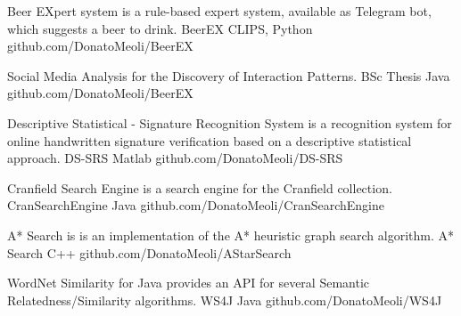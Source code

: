 

\begin{cventries}

  \cventry
    {Beer EXpert system is a rule-based expert system, available as Telegram bot, which suggests a beer to drink.} %
    {BeerEX} %
    {CLIPS, Python} %
    {github.com/DonatoMeoli/BeerEX} %
    {}

  \cventry
    {Social Media Analysis for the Discovery of Interaction Patterns.} %
    {BSc Thesis} %
    {Java} %
    {github.com/DonatoMeoli/BeerEX} %
    {}

  \cventry
    {Descriptive Statistical - Signature Recognition System is a recognition system for online handwritten signature verification based on a descriptive statistical approach.} %
    {DS-SRS} %
    {Matlab} %
    {github.com/DonatoMeoli/DS-SRS} %
    {}

  \cventry
    {Cranfield Search Engine is a search engine for the Cranfield collection.} %
    {CranSearchEngine} %
    {Java} %
    {github.com/DonatoMeoli/CranSearchEngine} %
    {}

  \cventry
    {A* Search is  is an implementation of the A* heuristic graph search algorithm.} %
    {A* Search} %
    {C++} %
    {github.com/DonatoMeoli/AStarSearch} %
    {}

  \cventry
    {WordNet Similarity for Java provides an API for several Semantic Relatedness/Similarity algorithms.} %
    {WS4J} %
    {Java} %
    {github.com/DonatoMeoli/WS4J} %
    {}

\end{cventries}
